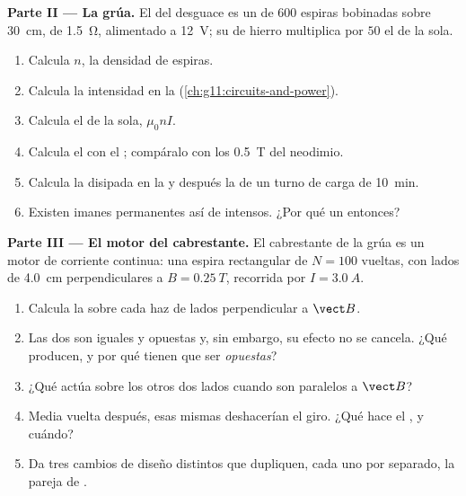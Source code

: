 \begin{problem}
\medskip
\noindent\textbf{Parte II --- La grúa.}
El  del desguace es un  de $600$ espiras bobinadas
sobre \qty{30}{cm}, de  \qty{1.5}{\ohm}, alimentado a
\qty{12}{V}; su  de hierro multiplica por $50$ el  de la
 sola.
\begin{enumerate}[resume]
  \item Calcula $n$, la densidad de espiras.
  \item Calcula la intensidad en la 
        (\cref{ch:g11:circuits-and-power}).
  \item Calcula el  de la  sola, $\mu_0 n I$.
  \item Calcula el  con el ; compáralo con los \qty{0.5}{T}
        del neodimio.
  \item Calcula la  disipada en la  y después la 
        de un turno de carga de \qty{10}{\minute}.
  \item Existen imanes permanentes así de intensos. ¿Por qué un
         entonces?
\end{enumerate}

\medskip
\noindent\textbf{Parte III --- El motor del cabrestante.}
El cabrestante de la grúa es un motor de corriente continua: una espira
rectangular de $N = 100$ vueltas, con lados de \qty{4.0}{cm}
perpendiculares a $B = \qty{0.25}{T}$, recorrida por
$I = \qty{3.0}{A}$.
\begin{enumerate}[resume]
  \item Calcula la  sobre cada haz de lados
        perpendicular a $\vect B$.
  \item Las dos  son iguales y opuestas y, sin embargo, su efecto
        no se cancela. ¿Qué producen, y por qué tienen que ser
        \emph{opuestas}?
  \item ¿Qué  actúa sobre los otros dos lados cuando son paralelos
        a $\vect B$?
  \item Media vuelta después, esas mismas  deshacerían el giro.
        ¿Qué hace el , y cuándo?
  \item Da tres cambios de diseño distintos que dupliquen, cada uno por
        separado, la pareja de .
\end{enumerate}


\end{problem}
